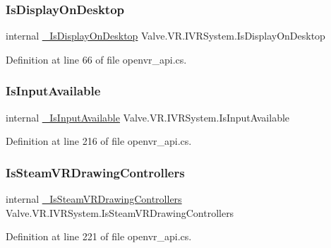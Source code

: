 \subsubsection{\texorpdfstring{IsDisplayOnDesktop}{IsDisplayOnDesktop}}
{\footnotesize\ttfamily internal \mbox{\hyperlink{struct_valve_1_1_v_r_1_1_i_v_r_system_a82b26bcb84c59e3b886653e6f52c9fdf}{\+\_\+\+Is\+Display\+On\+Desktop}} Valve.\+V\+R.\+I\+V\+R\+System.\+Is\+Display\+On\+Desktop}



Definition at line 66 of file openvr\+\_\+api.\+cs.

\mbox{\label{struct_valve_1_1_v_r_1_1_i_v_r_system_a19022fa80da6a1237bd179eb97a98c10}} 
\subsubsection{\texorpdfstring{IsInputAvailable}{IsInputAvailable}}
{\footnotesize\ttfamily internal \mbox{\hyperlink{struct_valve_1_1_v_r_1_1_i_v_r_system_ae830dd893c1ac74196be24544e94f9ca}{\+\_\+\+Is\+Input\+Available}} Valve.\+V\+R.\+I\+V\+R\+System.\+Is\+Input\+Available}



Definition at line 216 of file openvr\+\_\+api.\+cs.

\mbox{\label{struct_valve_1_1_v_r_1_1_i_v_r_system_a9ca8e0aa72557ad6d53936ce945d638f}} 
\subsubsection{\texorpdfstring{IsSteamVRDrawingControllers}{IsSteamVRDrawingControllers}}
{\footnotesize\ttfamily internal \mbox{\hyperlink{struct_valve_1_1_v_r_1_1_i_v_r_system_a160c811798537299b253f20e8bcc1e4d}{\+\_\+\+Is\+Steam\+V\+R\+Drawing\+Controllers}} Valve.\+V\+R.\+I\+V\+R\+System.\+Is\+Steam\+V\+R\+Drawing\+Controllers}



Definition at line 221 of file openvr\+\_\+api.\+cs.

